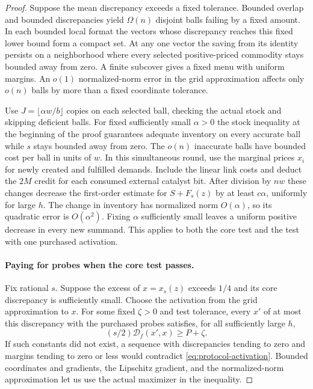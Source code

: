 \begin{proof}
Suppose the mean discrepancy exceeds a fixed tolerance. Bounded overlap
and bounded discrepancies yield $\Omega(n)$ disjoint balls failing by
a fixed amount. In each bounded local format the vectors whose
discrepancy reaches this fixed lower bound form a compact set. At any one
vector the saving from its identity persists on a neighborhood where every selected
positive-priced commodity stays bounded away from zero. A finite
subcover gives a fixed menu with uniform margins. An $o(1)$
normalized-norm error in the grid approximation affects only $o(n)$
balls by more than a fixed coordinate tolerance.

Use $J=\lfloor\alpha w/b\rfloor$ copies on each selected ball, checking
the actual stock and skipping deficient balls. For fixed sufficiently
small $\alpha>0$ the stock inequality at the beginning of the proof
guarantees adequate inventory on every accurate ball while $s$ stays
bounded away from zero. The $o(n)$ inaccurate balls have bounded
cost per ball in units of $w$. In this simultaneous round, use the marginal prices $x_i$ for newly
created and fulfilled demands. Include the linear link costs and deduct
the $2M$ credit for each consumed external catalyst bit. After division by $nw$ these changes decrease the
first-order estimate for $S+F_s(z)$ by at least $c\alpha$, uniformly
for large $h$. The change in inventory has normalized norm $O(\alpha)$,
so its quadratic error is $O(\alpha^2)$. Fixing $\alpha$ sufficiently
small leaves a uniform positive decrease in every new summand. This
applies to both the core test and the test with one purchased activation.

\paragraph{Paying for probes when the core test passes.}
Fix rational $s$. Suppose the excess of $x=x_s(z)$ exceeds $1/4$ and
its core discrepancy is sufficiently small. Choose the activation
from the grid approximation to $x$. For some fixed $\zeta>0$ and
test tolerance, every $x'$ of at most this discrepancy with the
purchased probes satisfies, for all sufficiently large $h$,
\[
                      (s/2)\mathcal D_f(x',x)\ge P+\zeta .
\]
If such constants did not exist, a sequence with discrepancies tending
to zero and margins tending to zero or less would contradict
\eqref{eq:protocol-activation}. Bounded coordinates and gradients,
the Lipschitz gradient, and the normalized-norm approximation let us
use the actual maximizer in the inequality.


\end{proof}
